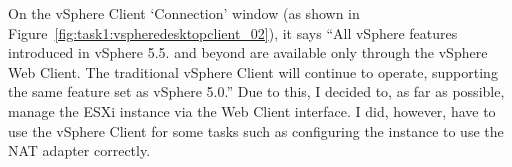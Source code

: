 \noindent On the vSphere Client `Connection' window (as shown in Figure~\ref{fig:task1:vspheredesktopclient_02}), it says ``All vSphere features introduced in vSphere 5.5. and beyond are available only through the vSphere Web Client. The traditional vSphere Client will continue to operate, supporting the same feature set as vSphere 5.0.'' Due to this, I decided to, as far as possible, manage the ESXi instance via the Web Client interface. I did, however, have to use the vSphere Client for some tasks such as configuring the instance to use the NAT adapter correctly.

